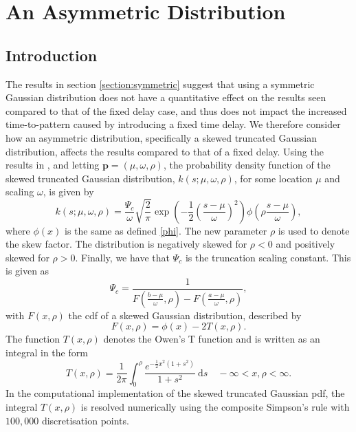 \section{An Asymmetric Distribution}
\subsection{Introduction}
The results in section \ref{section:symmetric} suggest that using a symmetric Gaussian distribution does not have a quantitative effect on the results seen compared to that of the fixed delay case, and thus does not impact the increased time-to-pattern caused by introducing a fixed time delay. We therefore consider how an asymmetric distribution, specifically a skewed truncated Gaussian distribution, affects the results compared to that of a fixed delay. Using the results in \cite{skewed}, and letting $\textbf{p}=(\mu,\omega,\rho)$, the probability density function of the skewed truncated Gaussian distribution, $k(s;\mu,\omega,\rho)$, for some location $\mu$ and scaling $\omega$, is given by
\begin{equation}
    k(s;\mu,\omega,\rho)=\frac{\Psi_c}{\omega}\sqrt{\frac{2}{\pi}}\exp\left(-\frac{1}{2}\left(\frac{s-\mu}{\omega}\right)^2\right)\phi\left(\rho\frac{s-\mu}{\omega}\right),
\end{equation}
where $\phi(x)$ is the same as defined \eqref{phi}. The new parameter $\rho$ is used to denote the skew factor. The distribution is negatively skewed for $\rho<0$ and positively skewed for $\rho>0$. Finally, we have that $\Psi_c$ is the truncation scaling constant. This is given as
\begin{equation}
    \Psi_c=\frac{1}{F\left(\frac{b-\mu}{\omega},\rho\right)-F\left(\frac{a-\mu}{\omega},\rho\right)},
\end{equation}
with $F(x,\rho)$ the cdf of a skewed Gaussian distribution, described by
\begin{equation}
    F(x,\rho)=\phi(x)-2T(x,\rho).
\end{equation}
The function $T(x,\rho)$ denotes the Owen's T function \cite{owenst} and is written as an integral in the form
\begin{equation}
    T(x,\rho)=\frac{1}{2\pi}\int_0^\rho\frac{e^{-\frac{1}{2}x^2(1+s^2)}}{1+s^2}\ \text{d}s\quad -\infty<x,\rho<\infty.
\end{equation}
In the computational implementation of the skewed truncated Gaussian pdf, the integral $T(x,\rho)$ is resolved numerically using the composite Simpson's rule with $100,000$ discretisation points.

